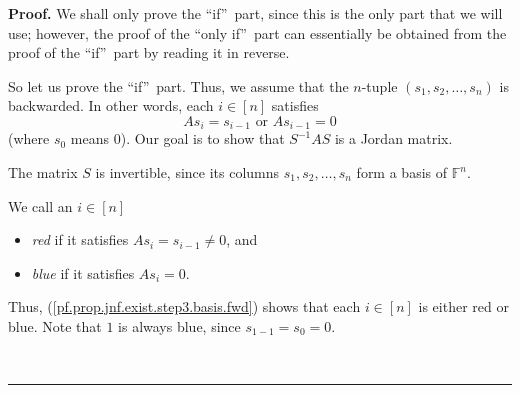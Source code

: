 \documentclass[numbers=enddot,12pt,final,onecolumn,notitlepage]{scrartcl}%
\numberwithin{exer}{subsection}
\theoremstyle{definition}
\newenvironment{proof}[1][Proof]{\noindent\textbf{#1.} }{\ \rule{0.5em}{0.5em}}
\begin{document}
\begin{proof}
We shall only prove the \textquotedblleft if\textquotedblright\ part, since
this is the only part that we will use; however, the proof of the
\textquotedblleft only if\textquotedblright\ part can essentially be obtained
from the proof of the \textquotedblleft if\textquotedblright\ part by reading
it in reverse.

So let us prove the \textquotedblleft if\textquotedblright\ part. Thus, we
assume that the $n$-tuple $\left(  s_{1},s_{2},\ldots,s_{n}\right)  $ is
backwarded. In other words, each $i\in\left[  n\right]  $ satisfies
\begin{equation}
As_{i}=s_{i-1}\text{ or }As_{i-1}=0 \label{pf.prop.jnf.exist.step3.basis.fwd}%
\end{equation}
(where $s_{0}$ means $0$). Our goal is to show that $S^{-1}AS$ is a Jordan matrix.

The matrix $S$ is invertible, since its columns $s_{1},s_{2},\ldots,s_{n}$
form a basis of $\mathbb{F}^{n}$.

We call an $i\in\left[  n\right]  $

\begin{itemize}
\item \emph{red} if it satisfies $As_{i}=s_{i-1}\neq0$, and

\item \emph{blue} if it satisfies $As_{i}=0$.
\end{itemize}

Thus, (\ref{pf.prop.jnf.exist.step3.basis.fwd}) shows that each $i\in\left[
n\right]  $ is either red or blue. Note that $1$ is always blue, since
$s_{1-1}=s_{0}=0$.


\end{proof}
\end{document}
